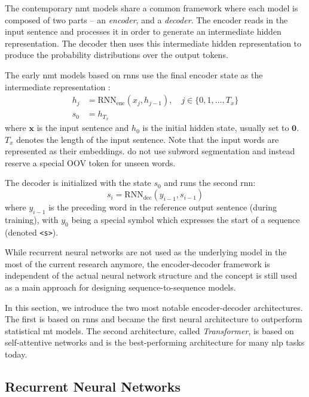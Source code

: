 The contemporary \ac{nmt} models share a common framework where each model is
composed of two parts -- an \emph{encoder}, and a \emph{decoder}. The encoder
reads in the input sentence and processes it in order to generate an
intermediate hidden representation.  The decoder then uses this intermediate
hidden representation to produce the probability distributions over the output
tokens.

The early \ac{nmt} models based on \acp{rnn} use the final encoder state as the
intermediate representation \citep{sutskever2014sequence}:
%
\begin{align}
  h_j &= \mathrm{RNN}_{\text{enc}}(x_j, h_{j-1}), \quad j \in
          \{0, 1, \ldots, T_x \} \\
  s_0 &= h_{T_x}
\end{align}
%
where $\mathbf{x}$ is the input sentence and $h_0$ is the initial hidden state,
usually set to $\mathbf{0}$. $T_x$ denotes the length of the input sentence.
Note that the input words are represented as their embeddings.
\citet{sutskever2014sequence} do not use subword segmentation and instead
reserve a special OOV token for unseen words.

The decoder is initialized with the state $s_0$ and runs the second \ac{rnn}:
\begin{equation} s_i = \mathrm{RNN}_{\text{dec}}(y_{i-1}, s_{i-1})
\end{equation}
%
where $y_{i-1}$ is the preceding word in the reference output sentence (during
training), with $y_0$ being a special symbol which expresses the start of a
sequence (denoted \texttt{<s>}).

While recurrent neural networks are not used as the underlying model in the most
of the current research anymore, the encoder-decoder framework is independent of
the actual neural network structure and the concept is still used as a main
approach for designing sequence-to-sequence models.

In this section, we introduce the two most notable encoder-decoder
architectures. The first is based on \acp{rnn} and became the first neural
architecture to outperform statistical \ac{mt} models. The second architecture,
called \emph{Transformer}, is based on self-attentive networks and is the
best-performing architecture for many \ac{nlp} tasks today.


\subsection{Recurrent Neural Networks}
\label{sec:encdec:rnn}

